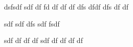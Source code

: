 dsfsdf
sdf
df
fd
df
df
df
dfs
dfdf
dfs
df
df

















sdf
sdf
dfs
sdf
fsdf

sdf
df
df
df
sdf
df
df
df
df
